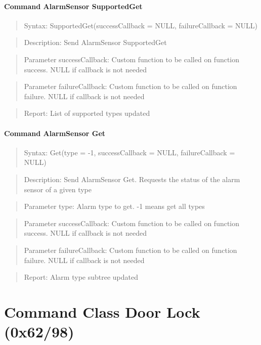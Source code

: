 \paragraph{Command AlarmSensor SupportedGet}
\begin{quote}Syntax: SupportedGet(successCallback = NULL, failureCallback = NULL)\end{quote}
\begin{quote}Description: Send AlarmSensor SupportedGet\end{quote}
\begin{quote}Parameter successCallback: Custom function to be called on function success. NULL if callback is not needed\end{quote}
\begin{quote}Parameter failureCallback: Custom function to be called on function failure. NULL if callback is not needed\end{quote}
\begin{quote}Report: List of supported types updated\end{quote}

\paragraph{Command AlarmSensor Get}
\begin{quote}Syntax: Get(type = -1, successCallback = NULL, failureCallback = NULL)\end{quote}
\begin{quote}Description: Send AlarmSensor Get. Requests the status of the alarm sensor of a given type\end{quote}
\begin{quote}Parameter type: Alarm type to get. -1 means get all types\end{quote}
\begin{quote}Parameter successCallback: Custom function to be called on function success. NULL if callback is not needed\end{quote}
\begin{quote}Parameter failureCallback: Custom function to be called on function failure. NULL if callback is not needed\end{quote}
\begin{quote}Report: Alarm type subtree updated\end{quote}


\section{Command Class Door Lock (0x62/98)}


